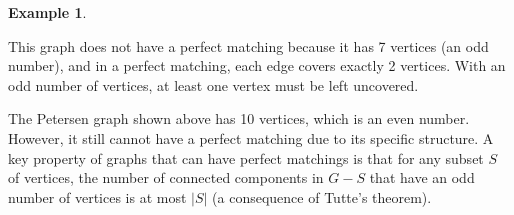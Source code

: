 \documentclass{article}
\theoremstyle{definition}
\newtheorem{example}{Example}
\begin{document}
\begin{example}
\begin{figure}[h]
\end{figure}

This graph does not have a perfect matching because it has 7 vertices (an odd number), and in a perfect matching, each edge covers exactly 2 vertices. With an odd number of vertices, at least one vertex must be left uncovered.

\begin{figure}[h]
\centering
{}
\end{figure}

The Petersen graph shown above has 10 vertices, which is an even number. However, it still cannot have a perfect matching due to its specific structure. A key property of graphs that can have perfect matchings is that for any subset $S$ of vertices, the number of connected components in $G - S$ that have an odd number of vertices is at most $|S|$ (a consequence of Tutte's theorem).
\end{example}
\end{document}
